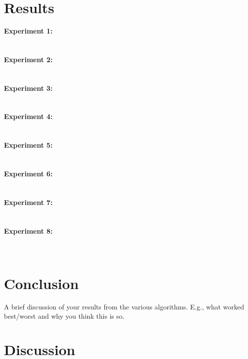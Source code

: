 \documentclass[11pt]{article}
\begin{document}
\begin{page}
\section{Results}

\textbf{Experiment 1:} \\\\

\\
\textbf{Experiment 2:} \\\\

\\
\textbf{Experiment 3:} \\\\

\\
\textbf{Experiment 4:} \\\\

\\
\textbf{Experiment 5:} \\\\

\\
\textbf{Experiment 6:} \\\\

\\
\textbf{Experiment 7:} \\\\

\\
\textbf{Experiment 8:} \\\\

\\

\section{Conclusion}
A brief discussion of your results from the various algorithms. E.g., what worked best/worst
and why you think this is so.\\

\section{Discussion}

\end{page}
\end{document}
